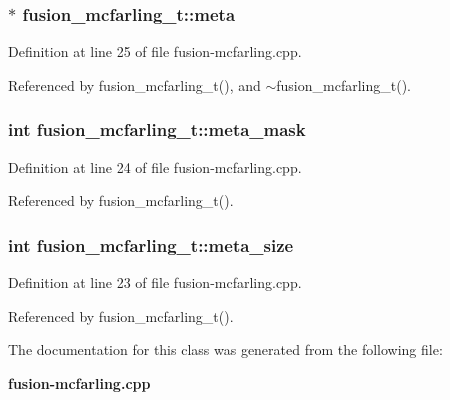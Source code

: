 \subsubsection[{meta}]{$\ast$ {\bf fusion\_\-mcfarling\_\-t::meta}\hspace{0.3cm}{\tt  [protected]}}\label{classfusion__mcfarling__t_16d6b9627beebac1a411709e3fcb42b5}




Definition at line 25 of file fusion-mcfarling.cpp.

Referenced by fusion\_\-mcfarling\_\-t(), and $\sim$fusion\_\-mcfarling\_\-t().
\subsubsection[{meta\_\-mask}]{\setlength{\rightskip}{0pt plus 5cm}int {\bf fusion\_\-mcfarling\_\-t::meta\_\-mask}\hspace{0.3cm}{\tt  [protected]}}\label{classfusion__mcfarling__t_65691d949f76ab2bedc07f9ce9e5373d}




Definition at line 24 of file fusion-mcfarling.cpp.

Referenced by fusion\_\-mcfarling\_\-t().
\subsubsection[{meta\_\-size}]{\setlength{\rightskip}{0pt plus 5cm}int {\bf fusion\_\-mcfarling\_\-t::meta\_\-size}\hspace{0.3cm}{\tt  [protected]}}\label{classfusion__mcfarling__t_bf15b0b824c8d7120c013fa02ab6b439}




Definition at line 23 of file fusion-mcfarling.cpp.

Referenced by fusion\_\-mcfarling\_\-t().

The documentation for this class was generated from the following file:\begin{CompactItemize}
\item 
{\bf fusion-mcfarling.cpp}\end{CompactItemize}
